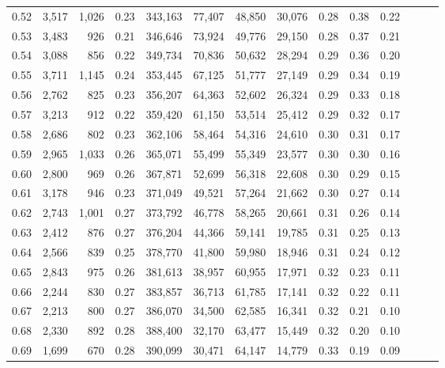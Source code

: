 \begin{tabular}{rrrrrrrrrrrrrr}
0.52 &   3,517 &  1,026 &  0.23 &  343,163 &   77,407 &  48,850 &  30,076 &  0.28 &  0.38 &      0.22 \\
0.53 &   3,483 &    926 &  0.21 &  346,646 &   73,924 &  49,776 &  29,150 &  0.28 &  0.37 &      0.21 \\
0.54 &   3,088 &    856 &  0.22 &  349,734 &   70,836 &  50,632 &  28,294 &  0.29 &  0.36 &      0.20 \\
0.55 &   3,711 &  1,145 &  0.24 &  353,445 &   67,125 &  51,777 &  27,149 &  0.29 &  0.34 &      0.19 \\
0.56 &   2,762 &    825 &  0.23 &  356,207 &   64,363 &  52,602 &  26,324 &  0.29 &  0.33 &      0.18 \\
0.57 &   3,213 &    912 &  0.22 &  359,420 &   61,150 &  53,514 &  25,412 &  0.29 &  0.32 &      0.17 \\
0.58 &   2,686 &    802 &  0.23 &  362,106 &   58,464 &  54,316 &  24,610 &  0.30 &  0.31 &      0.17 \\
0.59 &   2,965 &  1,033 &  0.26 &  365,071 &   55,499 &  55,349 &  23,577 &  0.30 &  0.30 &      0.16 \\
0.60 &   2,800 &    969 &  0.26 &  367,871 &   52,699 &  56,318 &  22,608 &  0.30 &  0.29 &      0.15 \\
0.61 &   3,178 &    946 &  0.23 &  371,049 &   49,521 &  57,264 &  21,662 &  0.30 &  0.27 &      0.14 \\
0.62 &   2,743 &  1,001 &  0.27 &  373,792 &   46,778 &  58,265 &  20,661 &  0.31 &  0.26 &      0.14 \\
0.63 &   2,412 &    876 &  0.27 &  376,204 &   44,366 &  59,141 &  19,785 &  0.31 &  0.25 &      0.13 \\
0.64 &   2,566 &    839 &  0.25 &  378,770 &   41,800 &  59,980 &  18,946 &  0.31 &  0.24 &      0.12 \\
0.65 &   2,843 &    975 &  0.26 &  381,613 &   38,957 &  60,955 &  17,971 &  0.32 &  0.23 &      0.11 \\
0.66 &   2,244 &    830 &  0.27 &  383,857 &   36,713 &  61,785 &  17,141 &  0.32 &  0.22 &      0.11 \\
0.67 &   2,213 &    800 &  0.27 &  386,070 &   34,500 &  62,585 &  16,341 &  0.32 &  0.21 &      0.10 \\
0.68 &   2,330 &    892 &  0.28 &  388,400 &   32,170 &  63,477 &  15,449 &  0.32 &  0.20 &      0.10 \\
0.69 &   1,699 &    670 &  0.28 &  390,099 &   30,471 &  64,147 &  14,779 &  0.33 &  0.19 &      0.09 \\

\end{tabular}
